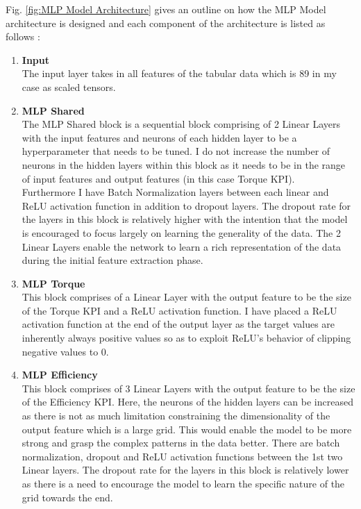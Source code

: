 \documentclass{report} %
\begin{document}
Fig. \ref{fig:MLP Model Architecture} gives an outline on how the \ac{MLP} Model architecture is designed and each component of the architecture is listed as follows :
\begin{enumerate}
    \item \textbf{Input} \\
    The input layer takes in all features of the tabular data which is 89 in my case as scaled tensors.
    \item \textbf{MLP Shared} \\
    The MLP Shared block is a sequential block comprising of 2 Linear Layers with the input features and neurons of each hidden layer to be a hyperparameter that needs to be tuned.
    I do not increase the number of neurons in the hidden layers within this block as it needs to be in the range of input features and output features (in this case Torque \ac{KPI}).\\
    Furthermore I have Batch Normalization layers between each linear and \ac{ReLU} activation function in addition to dropout layers.
    The dropout rate for the layers in this block is relatively higher with the intention that the model is encouraged to focus largely on learning the generality of the data.
    The 2 Linear Layers enable the network to learn a rich representation of the data during the initial feature extraction phase.
    \item \textbf{MLP Torque} \\
    This block comprises of a Linear Layer with the output feature to be the size of the Torque \ac{KPI} and a \ac{ReLU} activation function.
    I have placed a \ac{ReLU} activation function at the end of the output layer as the target values are inherently always positive values so as to exploit 
    \ac{ReLU}'s behavior of clipping negative values to 0.
    \item \textbf{MLP Efficiency} \\
    This block comprises of 3 Linear Layers with the output feature to be the size of the Efficiency \ac{KPI}.
    Here, the neurons of the hidden layers can be increased as there is not as much limitation constraining the dimensionality of the output feature which is a large grid.
    This would enable the model to be more strong and grasp the complex patterns in the data better.
    There are batch normalization, dropout and \ac{ReLU} activation functions between the 1st two Linear layers.
    The dropout rate for the layers in this block is relatively lower as there is a need to encourage the model to learn the specific nature of the grid towards the end.

\end{enumerate}
\end{document}
